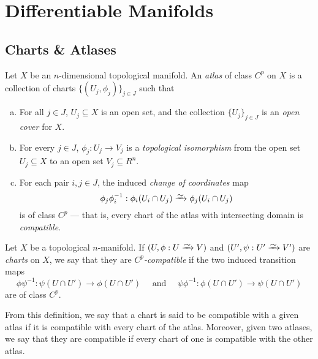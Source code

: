 \section{Differentiable Manifolds}

\subsection{Charts \& Atlases}

\begin{definition}[Atlas]
\label{def:Cp-atlas}
Let \(X\) be an \(n\)-dimensional topological manifold. An \emph{atlas} of class
\(C^p\) on \(X\) is a collection of charts \(\{(U_j, \phi_j)\}_{j \in J}\) such
that
\begin{enumerate}[(a)]\setlength\itemsep{0em}
\item For all \(j \in J\), \(U_j \subseteq X\) is an open set, and
  the collection \(\{U_j\}_{j \in J}\) is an \emph{open cover} for \(X\).

\item For every \(j \in J\), \(\phi_j: U_j \to V_j\) is a \emph{topological
  isomorphism} from the open set \(U_j \subseteq X\) to an open set \(V_j
  \subseteq R^n\).

\item For each pair \(i, j \in J\), the induced \emph{change of coordinates} map
  \[
  \phi_j \phi_i^{-1}: \phi_i(U_i \cap U_j) \isoto \phi_j(U_i \cap U_j)
  \]
  is of class \(C^p\) --- that is, every chart of the atlas with intersecting
  domain is \emph{compatible}.
\end{enumerate}
\end{definition}

\begin{definition}
\label{def:compatible-chart}
Let \(X\) be a topological \(n\)-manifold. If \((U, \phi: U \isoto V)\) and
\((U', \psi: U' \isoto V')\) are \emph{charts} on \(X\), we say that they are
\emph{\(C^p\)-compatible} if the two induced transition maps
\[
\phi \psi^{-1}: \psi(U \cap U') \longrightarrow \phi(U \cap U')
\quad\text{ and }\quad
\psi \phi^{-1}: \phi(U \cap U') \longrightarrow \psi(U \cap U')
\]
are of class \(C^p\).

From this definition, we say that a chart is said to be compatible with a given
atlas if it is compatible with every chart of the atlas.  Moreover, given two
atlases, we say that they are compatible if every chart of one is compatible
with the other atlas.
\end{definition}

